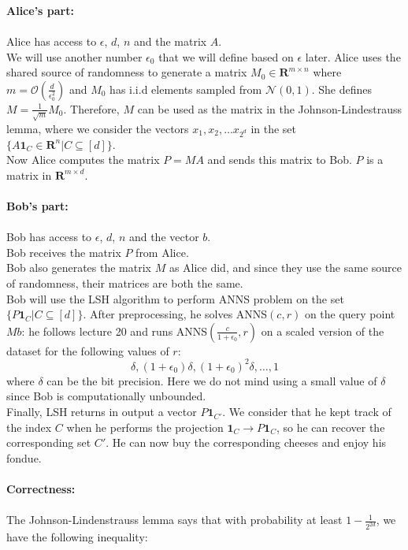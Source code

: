 \documentclass[a4paper, 11pt]{article}
\begin{document}
\textbf{Alice's part:}\\\\
Alice has access to $\epsilon$, $d$, $n$ and the matrix $A$.\\
We will use another number $\epsilon_0$ that we will define based on $\epsilon$ later.
Alice uses the shared source of randomness to generate a matrix $M_0\in \mathbf{R}^{m\times n}$ where $m=\mathcal{O}\left(\frac{d}{\epsilon_0^2}\right)$ and $M_0$ has i.i.d elements sampled from $\mathcal{N}(0, 1)$. She defines $M=\frac{1}{\sqrt{m}}M_0$. Therefore, $M$ can be used as the matrix in the Johnson-Lindestrauss lemma, where we consider the vectors $x_1,x_2,\dots x_{2^d}$ in the set $\{A\mathbf{1}_C \in \mathbf{R}^n | C\subseteq [d]\}$.\\
Now Alice computes the matrix $P=MA$ and sends this matrix to Bob. $P$ is a matrix in $\mathbf{R}^{m\times d}$.
\\\\
\textbf{Bob's part:}\\\\
Bob has access to $\epsilon$, $d$, $n$ and the vector $b$.\\
Bob receives the matrix $P$ from Alice.\\
Bob also generates the matrix $M$ as Alice did, and since they use the same source of randomness, their matrices are both the same.\\
Bob will use the LSH algorithm to perform ANNS problem on the set $\{P\mathbf{1}_C | C\subseteq [d]\}$.
After preprocessing, he solves ANNS$(c, r)$ on the query point $Mb$: he follows lecture 20 and runs ANNS$(\frac{c}{1+\epsilon_0}, r)$ on a scaled version of the dataset for the following values of $r$:
$$\delta, (1+\epsilon_0)\delta, (1+\epsilon_0)^2\delta,\dots,1$$ where $\delta$ can be the bit precision.
Here we do not mind using a small value of $\delta$ since Bob is computationally unbounded.\\
Finally, LSH returns in output a vector $P\mathbf{1}_{C'}$. We consider that he kept track of the index $C$ when he performs the projection $\mathbf{1}_C \longrightarrow P\mathbf{1}_C$, so he can recover the corresponding set $C'$. He can now buy the corresponding cheeses and enjoy his fondue.
\\\\
\textbf{Correctness:}\\\\
The Johnson-Lindenstrauss lemma says that with probability at least $1-\frac{1}{2^{2d}}$, we have the following inequality:
\end{document}

